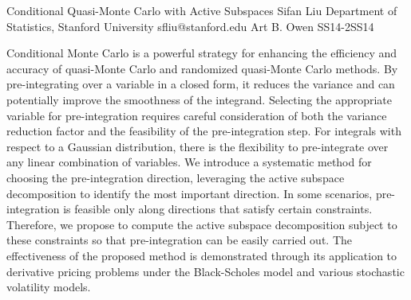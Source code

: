 \begin{talk}
  {Conditional Quasi-Monte Carlo with Active Subspaces}%
  {Sifan Liu}%
  {Department of Statistics, Stanford University}%
  {sfliu@stanford.edu}%
  {Art B. Owen}%
{}{}{SS14-2}{SS14}

			



Conditional Monte Carlo is a powerful strategy for enhancing the efficiency and accuracy of quasi-Monte Carlo and randomized quasi-Monte Carlo methods. By pre-integrating over a variable in a closed form, it reduces the variance and can potentially improve the smoothness of the integrand. Selecting the appropriate variable for pre-integration requires careful consideration of both the variance reduction factor and the feasibility of the pre-integration step. For integrals with respect to a Gaussian distribution, there is the flexibility to pre-integrate over any linear combination of variables. We introduce a systematic method for choosing the pre-integration direction, leveraging the active subspace decomposition to identify the most important direction. In some scenarios, pre-integration is feasible only along directions that satisfy certain constraints. Therefore, we propose to compute the active subspace decomposition subject to these constraints so that pre-integration can be easily carried out. The effectiveness of the proposed method is demonstrated through its application to derivative pricing problems under the Black-Scholes model and various stochastic volatility models.














\end{talk}

